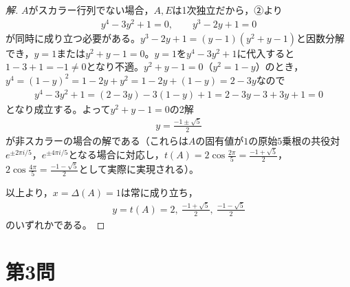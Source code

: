 \documentclass[../main.tex]{subfiles}
\begin{document}
\begin{proof}[解]
  $A$がスカラー行列でない場合，$A,E$は1次独立だから，②より
  \begin{align*}
    y^4-3y^2+1=0,\qquad y^3-2y+1=0
  \end{align*}
  が同時に成り立つ必要がある。$y^3-2y+1=(y-1)(y^2+y-1)$と因数分解でき，$y=1$または$y^2+y-1=0$。$y=1$を$y^4-3y^2+1$に代入すると$1-3+1=-1\neq0$となり不適。$y^2+y-1=0$（$y^2=1-y$）のとき，$y^4=(1-y)^2=1-2y+y^2=1-2y+(1-y)=2-3y$なので
  \begin{align*}
    y^4-3y^2+1=(2-3y)-3(1-y)+1=2-3y-3+3y+1=0
  \end{align*}
  となり成立する。よって$y^2+y-1=0$の2解
  \begin{align*}
    y=\frac{-1\pm\sqrt5}2
  \end{align*}
  が非スカラーの場合の解である（これらは$A$の固有値が$1$の原始$5$乗根の共役対$e^{\pm2\pi i/5}$，$e^{\pm4\pi i/5}$となる場合に対応し，$t(A)=2\cos\frac{2\pi}5=\frac{-1+\sqrt5}2$，$2\cos\frac{4\pi}5=\frac{-1-\sqrt5}2$として実際に実現される）。

  以上より，$x=\Delta(A)=1$は常に成り立ち，
  \begin{align*}
    y=t(A)=2,\ \frac{-1+\sqrt5}2,\ \frac{-1-\sqrt5}2
  \end{align*}
  のいずれかである。
\end{proof}

\newpage

\section*{第3問}
\end{document}
